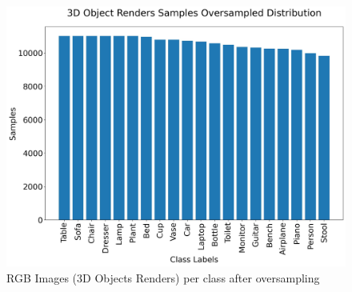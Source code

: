 \documentclass[11pt,a4paper]{article}
\begin{document}
\begin{figure}[H]
    \centering
    \includegraphics[scale=0.35]{imgs/3d-object-renders-transformations-oversampled-distribution.jpg}
    \caption{RGB Images (3D Objects Renders) per class after oversampling}
\end{figure}
\end{document}
